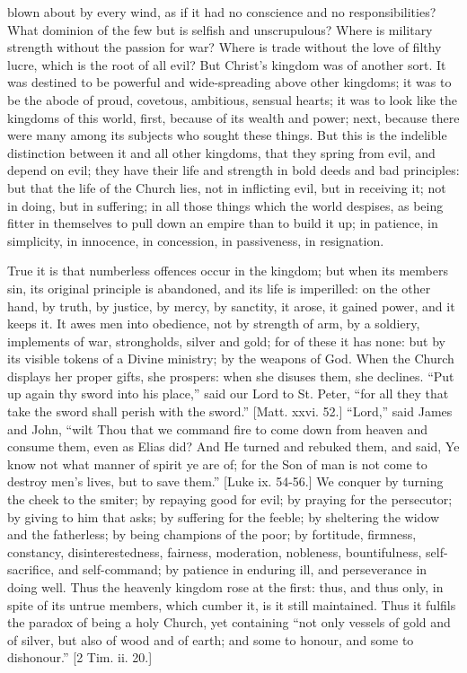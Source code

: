 blown about by every wind, as if it had no conscience and no
responsibilities? What dominion of the few but is selfish and
unscrupulous? Where is military strength without the passion for war?
Where is trade without the love of filthy lucre, which is the root of
all evil? But Christ's kingdom was of another sort. It was destined to
be powerful and wide-spreading above other kingdoms; it was to be the
abode of proud, covetous, ambitious, sensual hearts; it was to look
like the kingdoms of this world, first, because of its wealth and
power; next, because there were many among its subjects who sought
these things. But this is the indelible distinction between it and all
other kingdoms, that they spring from evil, and depend on evil; they
have their life and strength in bold deeds and bad principles: but
that the life of the Church lies, not in inflicting evil, but in
receiving it; not in doing, but in suffering; in all those things
which the world despises, as being fitter in themselves to pull down
an empire than to build it up; in patience, in simplicity, in
innocence, in concession, in passiveness, in resignation.

True it is that numberless offences occur in the kingdom; but when
its members sin, its original principle is abandoned, and its life is
imperilled: on the other hand, by truth, by justice, by mercy, by
sanctity, it arose, it gained power, and it keeps it. It awes men into
obedience, not by strength of arm, by a soldiery, implements of war,
strongholds, silver and gold; for of these it has none: but by its
visible tokens of a Divine ministry; by the weapons of God. When the
Church displays her proper gifts, she prospers: when she disuses them,
she declines. ``Put up again thy sword into his place,'' said
our Lord to St. Peter, ``for all they that take the sword shall
perish with the sword.'' [Matt. xxvi. 52.] ``Lord,'' said
James and John, ``wilt Thou that we command fire to come down from
heaven and consume them, even as Elias did? And He turned and rebuked
them, and said, Ye know not what manner of spirit ye are of; for the
Son of man is not come to destroy men's lives, but to save them.''
[Luke ix. 54-56.] We conquer by turning the cheek to the smiter; by
repaying good for evil; by praying for the persecutor; by giving to
him that asks; by suffering for the feeble; by sheltering the widow
and the fatherless; by being champions of the poor; by fortitude,
firmness, constancy, disinterestedness, fairness, moderation,
nobleness, bountifulness, self-sacrifice, and self-command; by
patience in enduring ill, and perseverance in doing well. Thus the
heavenly kingdom rose at the first: thus, and thus only, in spite of
its untrue members, which cumber it, is it still maintained. Thus it
fulfils the paradox of being a holy Church, yet containing ``not
only vessels of gold and of silver, but also of wood and of earth; and
some to honour, and some to dishonour.'' [2 Tim. ii. 20.]

